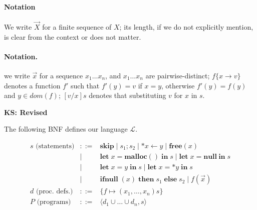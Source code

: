 \documentclass[english]{jssst_ppl} %
\newcommand\LET{\mathbf{let}\;}
\newcommand\IN{\mathbf{in}\;}
\newcommand\SKIP{\mathbf{skip}}
\newcommand\NULL{\mathbf{null}}
\newcommand\IFNULL{\mathbf{ifnull}\;}
\newcommand\THEN{\mathbf{then}\;}
\newcommand\ELSE{\mathbf{else}\;}
\newcommand\MALLOC{\mathbf{malloc()}\;}
\newcommand\Free{\mathbf{free}}
\newcommand\set[1]{\{#1\}}
\theoremstyle{definition}
\newcommand\todo[1]{{\bf KS: {#1}}}
\begin{document}

\paragraph{Notation} We write \(\vec{X}\) for a finite sequence of
\(X\); its length, if we do not explicitly mention, is clear from the
context or does not matter.

\paragraph{Notation.} we write $\vec{x}$ for a sequence $x_{1} \dots x_{n}$, and $x_{1} \dots x_{n}$ are pairwise-distinct; $f\{x\rightarrow v \}$ denotes a function $f'$ such that $f'(y) = v$ if $x = y$, otherwise $f'(y) = f(y)$ and $y \in dom(f)$; $[v/x]s$ denotes that substituting $v$ for $x$ in $s$.

\todo{Revised}

The following BNF defines our language \(\mathcal{L}\).

\begin{eqnarray*}
  s \mbox{ (statements)} & ::= &  \SKIP \mid s_{1};s_{2} \mid *x \leftarrow y \mid \Free(x) \\
  & \mid & \LET x = \MALLOC \IN s \mid \LET x = \NULL\ \IN s  \\
  & \mid & \LET x = y \; \IN s \mid   \LET x = *y \; \IN s \\
  & \mid & \IFNULL(x) \; \THEN s_{1}\; \ELSE s_{2} \mid f(\vec{x})\\
  d \mbox{ (proc. defs.)} & ::= & \set{f \mapsto (x_1,\dots,x_n)s}\\
  P \mbox{ (programs)} &::=& \langle d_1 \cup \dots \cup d_n, s \rangle\\
\end{eqnarray*}
\end{document}
